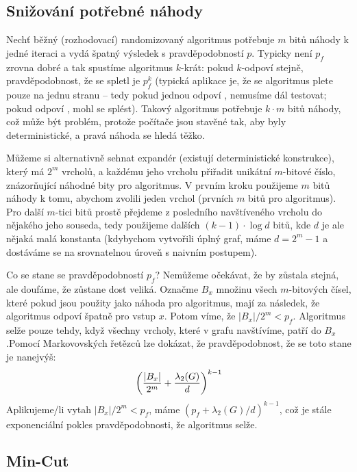 \subsection{Snižování potřebné náhody}

Nechť běžný (rozhodovací) randomizovaný algoritmus potřebuje $m$ bitů náhody k jedné iteraci a
vydá špatný výsledek s pravděpodobností $p$. Typicky není $p_f$ zrovna dobré a tak
spustíme algoritmus $k$-krát: pokud $k$-odpoví stejně, pravděpodobnost, že se
spletl je $p_f^k$ (typická aplikace je, že se algoritmus plete pouze na jednu
stranu -- tedy pokud jednou odpoví , nemusíme dál testovat; pokud odpoví
, mohl se splést). Takový algoritmus potřebuje $k\cdot m$ bitů náhody, což může být problém,
protože počítače jsou stavěné tak, aby byly deterministické, a pravá náhoda se
hledá těžko.

Můžeme si alternativně sehnat expandér (existují deterministické konstrukce),
který má $2^m$ vrcholů, a každému jeho vrcholu přiřadit unikátní $m$-bitové
číslo, znázorňující náhodné bity pro algoritmus. V prvním kroku použijeme $m$
bitů náhody k tomu, abychom zvolili jeden vrchol (prvních $m$ bitů pro
algoritmus). Pro další $m$-tici bitů prostě přejdeme z posledního navštíveného
vrcholu do nějakého jeho souseda, tedy použijeme dalších $(k -1) \cdot \log d$ bitů, kde $d$
je ale nějaká malá konstanta (kdybychom vytvořili úplný graf, máme $d = 2^m-1$ a
dostáváme se na srovnatelnou úroveň s naivním postupem).

Co se stane se pravděpodobností $p_f$? Nemůžeme očekávat, že by zůstala stejná,
ale doufáme, že zůstane dost veliká. Označme $B_x$ množinu všech $m$-bitových
čísel, které pokud jsou použity jako náhoda pro algoritmus, mají za následek, že
algoritmus odpoví špatně pro vstup $x$. Potom víme, že $|B_x|/2^m < p_f$.
Algoritmus selže pouze tehdy, když všechny vrcholy, které v grafu navštívíme,
patří do $B_x$.Pomocí Markovovských řetězců lze dokázat, že pravděpodobnost, že
se toto stane je nanejvýš:
\begin{align}
	\left({|B_x| \over 2^m} + {\lambda_2(G) \over d}\right)^{k-1}
\end{align}
Aplikujeme/li vytah $|B_x|/2^m < p_f$, máme $(p_f + \lambda_2(G)/d)^{k-1}$, což
je stále exponenciální pokles pravděpodobnosti, že algoritmus selže.

\subsection{Min-Cut}

